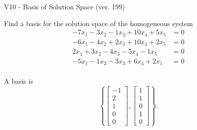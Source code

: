 \begin{exercise}
  \begin{exerciseTitle}V10 - Basis of Solution Space (ver. 199)\end{exerciseTitle}
  \begin{exerciseStatement}
    Find a basis for the solution space of the homogeneous system 
\begin{align*}
 -7 x_ 1 -3 x_ 2 -1 x_ 3 + 10 x_ 4 + 5 x_ 5 &= 0  \\ 
  -6 x_ 1 -4 x_ 2 + 2 x_ 3 + 10 x_ 4 + 2 x_ 5 &= 0  \\ 
  2 x_ 1 + 3 x_ 2 -4 x_ 3 -5 x_ 4 -1 x_ 5 &= 0  \\ 
  -5 x_ 1 -1 x_ 2 -3 x_ 3 + 6 x_ 4 + 2 x_ 5 &= 0  \\ 
 \end{align*}


 
  \end{exerciseStatement}

  \begin{exerciseAnswer}
   A basis is   
\[\left\{\left[\begin{array}{c}
-1 \\
2 \\
1 \\
0 \\
0
\end{array}\right] , \left[\begin{array}{c}
1 \\
1 \\
0 \\
1 \\
0
\end{array}\right]\right\}.\]

  


  \end{exerciseAnswer}
\end{exercise}